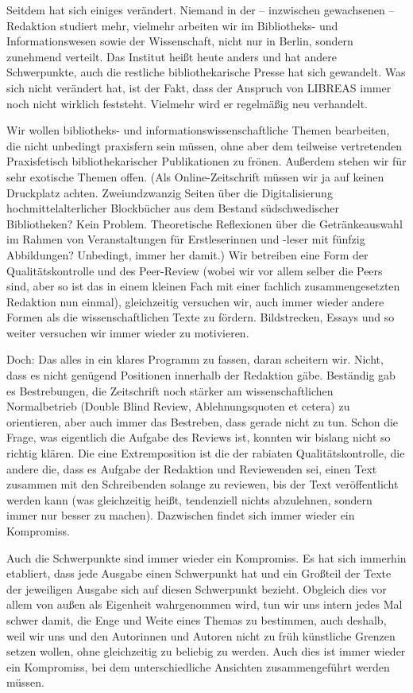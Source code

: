 \documentclass[output=paper]{langscibook}
\begin{document}
Seitdem hat sich einiges verändert. Niemand in der – inzwischen gewachsenen – Redaktion studiert mehr, vielmehr arbeiten wir im Bibliotheks- und Informationswesen sowie der Wissenschaft, nicht nur in Berlin, sondern zunehmend verteilt. Das Institut heißt heute anders und hat andere Schwerpunkte, auch die restliche bibliothekarische Presse hat sich gewandelt. Was sich nicht verändert hat, ist der Fakt, dass der Anspruch von LIBREAS immer noch nicht wirklich feststeht. Vielmehr wird er regelmäßig neu verhandelt.

Wir wollen bibliotheks- und informationswissenschaftliche Themen bearbeiten, die nicht unbedingt praxisfern sein müssen, ohne aber dem teilweise vertretenden Praxisfetisch bibliothekarischer Publikationen zu frönen. Außerdem stehen wir für sehr exotische Themen offen. (Als Online-Zeitschrift müssen wir ja auf keinen Druckplatz achten. Zweiundzwanzig Seiten über die Digitalisierung hochmittelalterlicher Blockbücher aus dem Bestand südschwedischer Bibliotheken? Kein Problem. Theoretische Reflexionen über die Getränkeauswahl im Rahmen von Veranstaltungen für Erstleserinnen und -leser mit fünfzig Abbildungen? Unbedingt, immer her damit.) Wir betreiben eine Form der Qualitätskontrolle und des Peer-Review (wobei wir vor allem selber die Peers sind, aber so ist das in einem kleinen Fach mit einer fachlich zusammengesetzten Redaktion nun einmal), gleichzeitig versuchen wir, auch immer wieder andere Formen als die wissenschaftlichen Texte zu fördern. Bildstrecken, Essays und so weiter versuchen wir immer wieder zu motivieren.

Doch: Das alles in ein klares Programm zu fassen, daran scheitern wir. Nicht, dass es nicht genügend Positionen innerhalb der Redaktion gäbe. Beständig gab es Bestrebungen, die Zeitschrift noch stärker am wissenschaftlichen Normalbetrieb (Double Blind Review, Ablehnungsquoten et cetera) zu orientieren, aber auch immer das Bestreben, dass gerade nicht zu tun. Schon die Frage, was eigentlich die Aufgabe des Reviews ist, konnten wir bislang nicht so richtig klären. Die eine Extremposition ist die der rabiaten Qualitätskontrolle, die andere die, dass es Aufgabe der Redaktion und Reviewenden sei, einen Text zusammen mit den Schreibenden solange zu reviewen, bis der Text veröffentlicht werden kann (was gleichzeitig heißt, tendenziell nichts abzulehnen, sondern immer nur besser zu machen). Dazwischen findet sich immer wieder ein Kompromiss.

Auch die Schwerpunkte sind immer wieder ein Kompromiss. Es hat sich immerhin etabliert, dass jede Ausgabe einen Schwerpunkt hat und ein Großteil der Texte der jeweiligen Ausgabe sich auf diesen Schwerpunkt bezieht. Obgleich dies vor allem von außen als Eigenheit wahrgenommen wird, tun wir uns intern jedes Mal schwer damit, die Enge und Weite eines Themas zu bestimmen, auch deshalb, weil wir uns und den Autorinnen und Autoren nicht zu früh künstliche Grenzen setzen wollen, ohne gleichzeitig zu beliebig zu werden. Auch dies ist immer wieder ein Kompromiss, bei dem unterschiedliche Ansichten zusammengeführt werden müssen.
\end{document}
